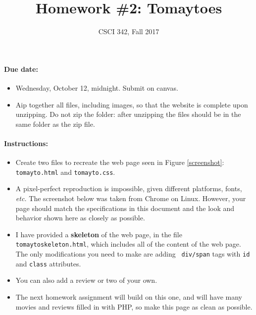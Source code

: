 \documentclass{article}
\title{Homework \#2: Tomaytoes}
\author{CSCI 342, Fall 2017}
\begin{document}
\maketitle


\paragraph{Due date:}
\begin{itemize}
  \item
Wednesday, October 12, midnight.  Submit on canvas.
\item Aip together all files, including images, so that the website
  is complete upon unzipping.  Do not zip the folder: after unzipping
  the files should be in the same folder as the zip file.
  \end{itemize}

\paragraph{Instructions:}
\begin{itemize}
  \item
Create two files to recreate the web page seen
in Figure \ref{screenshot}:
{\tt tomayto.html} and
{\tt tomayto.css}.
\item
A pixel-perfect reproduction is impossible, given different
platforms, fonts, {\em etc.}  The screenshot below was taken from
Chrome on Linux.  However, your page should match the
specifications in this document and the look and behavior shown
here as closely as possible.
\item
I have provided a {\bf skeleton} of the web page, in the file {\tt
  tomaytoskeleton.html}, which includes all of the content of the
web page.  The only modifications you need to make are adding {\tt
  div/span} tags with {\tt id} and {\tt class} attributes.
\item
You can also add a review or two of your own.
\item
The next homework assignment will build on this one, and will have
many movies and reviews filled in with PHP, so make this page as
clean as possible.
\end{itemize}
\end{document}

